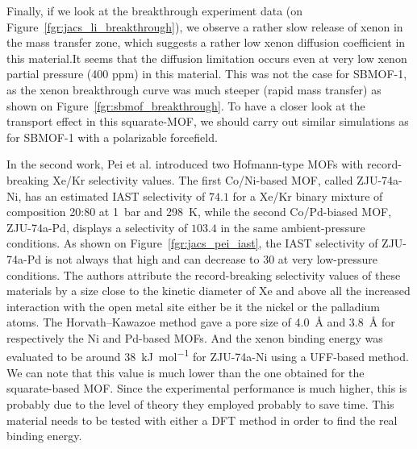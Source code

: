 \documentclass[main]{subfiles}
\begin{document}
Finally, if we look at the breakthrough experiment data (on Figure~\ref{fgr:jacs_li_breakthrough}), we observe a rather slow release of xenon in the mass transfer zone, which suggests a rather low xenon diffusion coefficient in this material.It seems that the diffusion limitation occurs even at very low xenon partial pressure (400 ppm) in this material. This was not the case for SBMOF-1, as the xenon breakthrough curve was much steeper (rapid mass transfer) as shown on Figure~\ref{fgr:sbmof_breakthrough}. To have a closer look at the transport effect in this squarate-MOF, we should carry out similar simulations as for SBMOF-1 with a polarizable forcefield. 

In the second work,\autocite{Pei_2022} Pei et al. introduced two Hofmann-type MOFs with record-breaking Xe/Kr selectivity values. The first Co/Ni-based MOF, called ZJU-74a-Ni, has an estimated IAST selectivity of $74.1$ for a Xe/Kr binary mixture of composition 20:80 at \SI{1}{\bar} and \SI{298}{\kelvin}, while the second Co/Pd-biased MOF, ZJU-74a-Pd, displays a selectivity of $103.4$ in the same ambient-pressure conditions. As shown on Figure~\ref{fgr:jacs_pei_iast}, the IAST selectivity of ZJU-74a-Pd is not always that high and can decrease to $30$ at very low-pressure conditions. The authors attribute the record-breaking selectivity values of these materials by a size close to the kinetic diameter of Xe and above all the increased interaction with the open metal site either be it the nickel or the palladium atoms. The Horvath–Kawazoe method gave a pore size of \SI{4.0}{\angstrom} and \SI{3.8}{\angstrom} for respectively the Ni and Pd-based MOFs. And the xenon binding energy was evaluated to be around \SI{38}{\kJ\per\mole} for ZJU-74a-Ni using a UFF-based method. We can note that this value is much lower than the one obtained for the squarate-based MOF. Since the experimental performance is much higher, this is probably due to the level of theory they employed probably to save time. This material needs to be tested with either a DFT method in order to find the real binding energy. 
\end{document}
